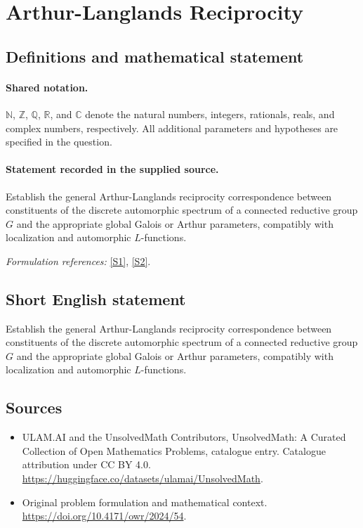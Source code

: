 \documentclass[11pt]{article}
\newcommand{\sref}[2]{\hyperlink{source:#1:#2}{[S#2]}}
\begin{document}
\section{Arthur-Langlands Reciprocity}\label{statement}

\subsection{Definitions and mathematical statement}

\paragraph{Shared notation.}$\mathbb N$, $\mathbb Z$, $\mathbb Q$, $\mathbb R$, and $\mathbb C$ denote the natural numbers, integers, rationals, reals, and complex numbers, respectively. All additional parameters and hypotheses are specified in the question.


\paragraph{Statement recorded in the supplied source.}
Establish the general Arthur-Langlands reciprocity correspondence between constituents of the discrete automorphic spectrum of a connected reductive group $G$ and the appropriate global Galois or Arthur parameters, compatibly with localization and automorphic $L$-functions.
\par\smallskip\textit{Formulation references:} \sref{statement}{1}, \sref{statement}{2}.
\subsection{Short English statement}
Establish the general Arthur-Langlands reciprocity correspondence between constituents of the discrete automorphic spectrum of a connected reductive group $G$ and the appropriate global Galois or Arthur parameters, compatibly with localization and automorphic $L$-functions.
\subsection{Sources}
\begin{itemize}
\item[\hypertarget{source:statement:1}{S1}] ULAM.AI and the UnsolvedMath Contributors, UnsolvedMath: A Curated Collection of Open Mathematics Problems, catalogue entry. Catalogue attribution under CC BY 4.0.
\url{https://huggingface.co/datasets/ulamai/UnsolvedMath}.
\item[\hypertarget{source:statement:2}{S2}] Original problem formulation and mathematical context.
\url{https://doi.org/10.4171/owr/2024/54}.
\end{itemize}
\label{end:statement}
\end{document}
